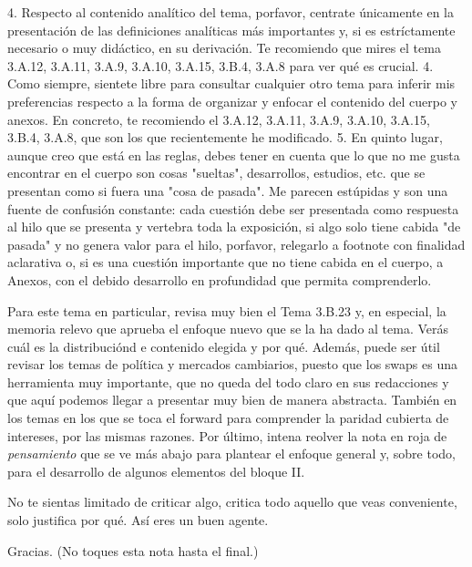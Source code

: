 \documentclass[10pt,a4paper]{article}
\newcounter{anexo}
\begin{document}
{{    4. Respecto al contenido analítico del tema, porfavor, centrate únicamente en la presentación de las definiciones analíticas más importantes y, si es estríctamente necesario o muy didáctico, en su derivación. Te recomiendo que mires el tema 3.A.12, 3.A.11, 3.A.9, 3.A.10, 3.A.15, 3.B.4, 3.A.8 para ver qué es crucial. 
    4. Como siempre, sientete libre para consultar cualquier otro tema para inferir mis preferencias respecto a la forma de organizar y enfocar el contenido del cuerpo y anexos. En concreto, te recomiendo el 3.A.12, 3.A.11, 3.A.9, 3.A.10, 3.A.15, 3.B.4, 3.A.8, que son los que recientemente he modificado. 
    5. En quinto lugar, aunque creo que está en las reglas, debes tener en cuenta que lo que no me gusta encontrar en el cuerpo son cosas "sueltas", desarrollos, estudios, etc. que se presentan como si fuera una "cosa de pasada". Me parecen estúpidas y son una fuente de confusión constante: cada cuestión debe ser presentada como respuesta al hilo que se presenta y vertebra toda la exposición, si algo solo tiene cabida "de pasada" y no genera valor para el hilo, porfavor, relegarlo a footnote con finalidad aclarativa o, si es una cuestión importante que no tiene cabida en el cuerpo, a Anexos, con el debido desarrollo en profundidad que permita comprenderlo.

    Para este tema en particular, revisa muy bien el Tema 3.B.23 y, en especial, la memoria relevo que aprueba el enfoque nuevo que se la ha dado al tema. Verás cuál es la distribuciónd e contenido elegida y por qué. Además, puede ser útil revisar los temas de política y mercados cambiarios, puesto que los swaps es una herramienta muy importante, que no queda del todo claro en sus redacciones y que aquí podemos llegar a presentar muy bien de manera abstracta. También en los temas en los que se toca el forward para comprender la paridad cubierta de intereses, por las mismas razones. Por último, intena reolver la nota en roja de \textit{pensamiento} que se ve más abajo para plantear el enfoque general y, sobre todo, para el desarrollo de algunos elementos del bloque II.

    No te sientas limitado de criticar algo, critica todo aquello que veas conveniente, solo justifica por qué. Así eres un buen agente. 

    Gracias. (No toques esta nota hasta el final.)
    }

}
\end{document}
